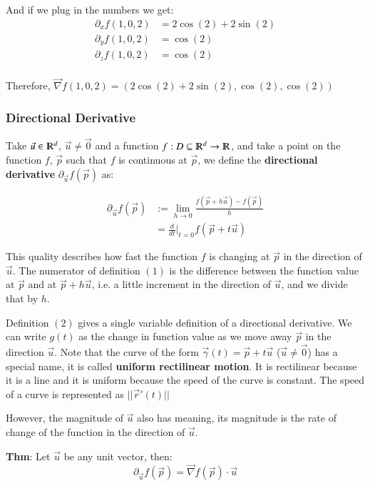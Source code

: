 \documentclass [12 pt, twoside] {book}
\newcommand\+{\text{ }}
\begin{document}
And if we plug in the numbers we get:
\begin{align*}
    \partial_x f(1,0,2) &= 2\cos(2) + 2\sin(2)\\
    \partial_y f(1,0,2) &= \cos(2)\\
    \partial_z f(1,0,2) &= \cos(2)\\
\end{align*}

Therefore, $\boxed{\vec{\nabla}f(1,0,2) = (2 \cos(2) + 2\sin(2), \cos(2),
\cos(2))}$

\subsubsection{Directional Derivative}

Take $\vec{u} \in \varmathbb{R}^d$, $\vec{u} \neq \vec{0}$ and a function $f: D
\subseteq \varmathbb{R}^d \to \varmathbb{R}$, and take a point on
the function $f$, $\vec{p}$ such that $f$ is continuous at $\vec{p}$, we define
the \textbf{directional derivative} $\partial_{\vec{u}}f(\vec{p})$ as:

\begin{align}
    \partial_{\vec{u}}f(\vec{p}) &:= \lim_{h\to0} \frac{f(\vec{p} + h\vec{u}) - f(\vec{p})}{h}\\
                                 &= \frac{d}{dt}\bigg|_{t=0} f(\vec{p} + t\vec{u})
\end{align}

This quality describes how fast the function $f$ is changing at $\vec{p}$ in the
direction of $\vec{u}$. The numerator of definition $(1)$ is the difference
between the function value at $\vec{p}$ and at $\vec{p} + h\vec{u}$, i.e. a
little increment in the direction of $\vec{u}$, and we divide that by $h$.

Definition $(2)$ gives a single variable definition of a directional derivative.
We can write $g(t)$ as the change in function value as we move away $\vec{p}$ in
the direction $\vec{u}$. Note that the curve of the form $\vec{\gamma}(t) =
\vec{p} + t\vec{u}$ ($\vec{u} \neq \vec{0}$) has a special name, it is called
\textbf{uniform rectilinear motion}. It is rectilinear because it is a line and
it is uniform because the speed of the curve is constant. The speed of a curve
is represented as $||\vec{r}'(t)||$

However, the magnitude of $\vec{u}$ also has meaning, its magnitude is the rate
of change of the function in the direction of $\vec{u}$.

\textbf{Thm}: Let $\vec{u}$ be any unit vector, then:
$$\partial_{\vec{u}}f(\vec{p}) = \vec{\nabla}f(\vec{p}) \cdot \vec{u}$$
\end{document}
